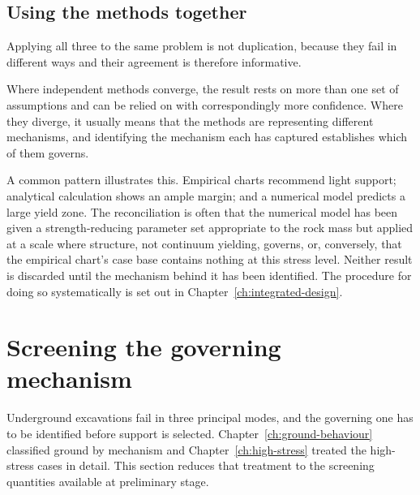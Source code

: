 \subsection{Using the methods together}
\label{sec:methods-together}

Applying all three to the same problem is not duplication, because they fail
in different ways and their agreement is therefore informative.

Where independent methods converge, the result rests on more than one set of
assumptions and can be relied on with correspondingly more confidence. Where
they diverge, it
usually means that the methods are representing different mechanisms, and
identifying the mechanism each has captured establishes which of them governs.

A common pattern illustrates this. Empirical charts recommend light support;
analytical calculation shows an ample margin; and a numerical model predicts a
large yield zone. The reconciliation is often that the numerical model has
been given a strength-reducing parameter set appropriate to the rock mass but
applied at a scale where structure, not continuum yielding, governs,
or, conversely, that the empirical chart's case base contains nothing at
this stress level. Neither result is discarded until the mechanism behind
it has been identified.
The procedure for doing so systematically is set out in
Chapter~\ref{ch:integrated-design}.

\section{Screening the governing mechanism}
\label{sec:mechanism-screening}

Underground excavations fail in three principal modes, and the governing one
has to be identified before support is selected.
Chapter~\ref{ch:ground-behaviour} classified ground by mechanism and
Chapter~\ref{ch:high-stress} treated the high-stress cases in detail. This
section reduces that treatment to the screening quantities available at
preliminary stage.

